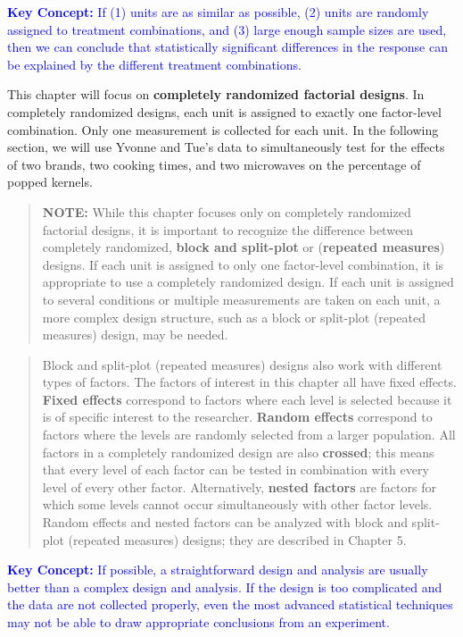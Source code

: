 \documentclass[
]{report}
\begin{document}
\textbf{\textcolor{blue}{Key Concept:}} \textcolor{blue}{If (1) units are as similar as possible, (2) units are randomly assigned to treatment combinations, and (3) large enough sample sizes are used, then we can conclude that statistically significant differences in the response can be explained by the different treatment combinations.}

This chapter will focus on \textbf{completely randomized factorial designs}. In completely randomized designs, each unit is assigned to exactly one factor-level combination. Only one measurement is collected for each unit. In the following section, we will use Yvonne and Tue's data to simultaneously test for the effects of two brands, two cooking times, and two microwaves on the percentage of popped kernels.

\begin{quote}
\textbf{NOTE:} While this chapter focuses only on completely randomized factorial designs, it is important to recognize the difference between completely randomized, \textbf{block and split-plot} or (\textbf{repeated measures}) designs. If each unit is assigned to only one factor-level combination, it is appropriate to use a completely randomized design. If each unit is assigned to several conditions or multiple measurements are taken on each unit, a more complex design structure, such as a block or split-plot (repeated measures) design, may be needed.
\end{quote}

\begin{quote}
Block and split-plot (repeated measures) designs also work with different types of factors. The factors of interest in this chapter all have fixed effects. \textbf{Fixed effects} correspond to factors where each level is selected because it is of specific interest to the researcher. \textbf{Random effects} correspond to factors where the levels are randomly selected from a larger population. All factors in a completely randomized design are also \textbf{crossed}; this means that every level of each factor can be tested in combination with every level of every other factor. Alternatively, \textbf{nested factors} are factors for which some levels cannot occur simultaneously with other factor levels. Random effects and nested factors can be analyzed with block and split-plot (repeated measures) designs; they are described in Chapter 5.
\end{quote}

\textbf{\textcolor{blue}{Key Concept:}} \textcolor{blue}{If possible, a straightforward design and analysis are usually better than a complex design and analysis. If the design is too complicated and the data are not collected properly, even the most advanced statistical techniques may not be able to draw appropriate conclusions from an experiment.}
\end{document}
